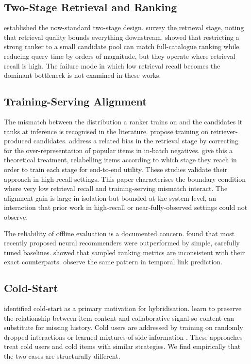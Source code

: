 \documentclass[10pt,twocolumn]{article}
\begin{document}
\subsection{Two-Stage Retrieval and Ranking}
\citet{covington2016deep} established the now-standard two-stage design.
\citet{huang2025survey} survey the retrieval stage, noting that retrieval
quality bounds everything downstream. \citet{kang2019candidate} showed that
restricting a strong ranker to a small candidate pool can match full-catalogue
ranking while reducing query time by orders of magnitude, but they operate
where retrieval recall is high. The failure mode in which low retrieval recall
becomes the dominant bottleneck is not examined in these works.

\subsection{Training-Serving Alignment}
The mismatch between the distribution a ranker trains on and the candidates it
ranks at inference is recognised in the literature.
\citet{kang2019candidate} propose training on retriever-produced candidates.
\citet{yi2019sampling} address a related bias in the retrieval stage by
correcting for the over-representation of popular items in in-batch negatives.
\citet{zheng2024full} give this a theoretical treatment, relabelling items
according to which stage they reach in order to train each stage for
end-to-end utility. These studies validate their approach in high-recall
settings. This paper characterises the boundary condition where very low
retrieval recall and training-serving mismatch interact. The alignment gain is
large in isolation but bounded at the system level, an interaction that prior
work in high-recall or near-fully-observed settings could not observe.

The reliability of offline evaluation is a documented concern.
\citet{dacrema2019really} found that most recently proposed neural
recommenders were outperformed by simple, carefully tuned baselines.
\citet{krichene2020sampled} showed that sampled ranking metrics are
inconsistent with their exact counterparts. \citet{cornell2025measuring}
observe the same pattern in temporal link prediction.

\subsection{Cold-Start}
\citet{burke2002hybrid} identified cold-start as a primary motivation for
hybridisation. \citet{wei2021contrastive} learn to preserve the relationship
between item content and collaborative signal so content can substitute for
missing history. Cold users are addressed by training on randomly dropped
interactions \citep{volkovs2017dropoutnet} or learned mixtures of side
information \citep{yu2020tagnn}. These approaches treat cold users and cold
items with similar strategies. We find empirically that the two cases are
structurally different.
\end{document}
